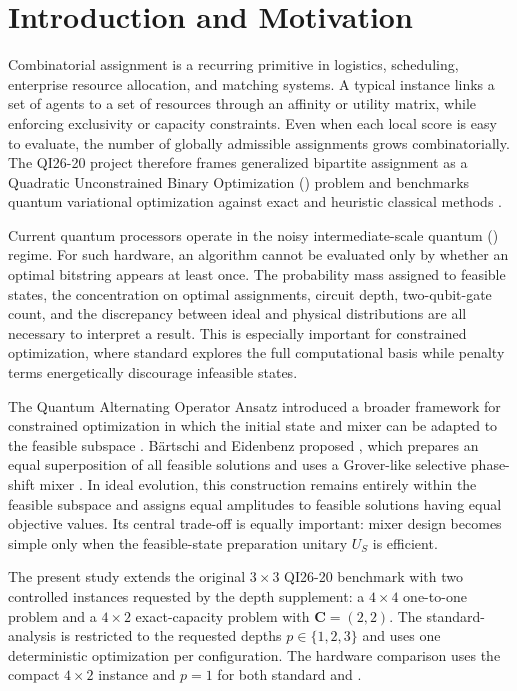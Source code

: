\section{Introduction and Motivation}

Combinatorial assignment is a recurring primitive in logistics, scheduling, enterprise resource allocation, and matching systems. A typical instance links a set of agents to a set of resources through an affinity or utility matrix, while enforcing exclusivity or capacity constraints. Even when each local score is easy to evaluate, the number of globally admissible assignments grows combinatorially. The QI26-20 project therefore frames generalized bipartite assignment as a Quadratic Unconstrained Binary Optimization (\QUBO{}) problem and benchmarks quantum variational optimization against exact and heuristic classical methods \cite{qi2620}.

Current quantum processors operate in the noisy intermediate-scale quantum (\NISQ{}) regime. For such hardware, an algorithm cannot be evaluated only by whether an optimal bitstring appears at least once. The probability mass assigned to feasible states, the concentration on optimal assignments, circuit depth, two-qubit-gate count, and the discrepancy between ideal and physical distributions are all necessary to interpret a result. This is especially important for constrained optimization, where standard \QAOA{} explores the full computational basis while penalty terms energetically discourage infeasible states.

The Quantum Alternating Operator Ansatz introduced a broader framework for constrained optimization in which the initial state and mixer can be adapted to the feasible subspace \cite{hadfield2019}. Bärtschi and Eidenbenz proposed \GMQAOA{}, which prepares an equal superposition of all feasible solutions and uses a Grover-like selective phase-shift mixer \cite{baertschi2020}. In ideal evolution, this construction remains entirely within the feasible subspace and assigns equal amplitudes to feasible solutions having equal objective values. Its central trade-off is equally important: mixer design becomes simple only when the feasible-state preparation unitary $U_S$ is efficient.

The present study extends the original $3\times3$ QI26-20 benchmark with two controlled instances requested by the depth supplement: a $4\times4$ one-to-one problem and a $4\times2$ exact-capacity problem with $\bm C=(2,2)$. The standard-\QAOA{} analysis is restricted to the requested depths $p\in\{1,2,3\}$ and uses one deterministic optimization per configuration. The hardware comparison uses the compact $4\times2$ instance and $p=1$ for both standard \QAOA{} and \GMQAOA{}.

